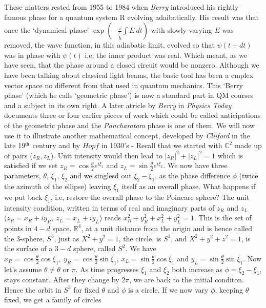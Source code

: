 These matters rested from 1955 to 1984 when \textit{Berry} introduced his rightly
famous phase for a quantum system R evolving adaibatically. His result was that
once the `dynamical phase' $\exp(-  \frac{i}{\not{h}} \int E ~dt)$  with slowly varying $E$ was removed,
the wave function, in this adiabatic limit, evolved so that $\psi(t + dt)$ was in phase
with $\psi(t)$ i.e, the inner product was real. Which meant, as we have seen, that
the phase around a closed circuit would be nonzero. Although we have been
talking about classical light beams, the basic tool has been a cmplex vector
space no different from that used in quantum mechanics. This `Berry phase'
(which he calls `geometric phase') is now a standard part in QM courses and a
subject in its own right. A later atricle by \textit{Berry} in \textit{Physics Today} documents
three or four earlier pieces of work which could be called anticipations of the
geometric phase and the \textit{Pancharatam} phase is one of them. We will now use
it to illustrate another mathematical concept, developed by \textit{Cliiford} in the late
19$^{\rm th}$ century and by $Hopf$ in 1930's - Recall that we started with $\mathbb{C}^2$ made up
of pairs ($z_R, z_L$). Unit intensity would then lead to $| z_R |^2 + | z_L |^2 = 1$ which
is satisfied if we set $z_R = \cos \frac{\theta}{2} e^{i \xi_1}$ and $z_L = \sin \frac{\theta}{2} e^{i \xi_2}$. We now have three
parameters, $\theta$, $\xi_1$, $\xi_2$ and we singlesd out $\xi_2 - \xi_1$, as the phase difference $\phi$ (twice
the azimuth of the ellipse) leaving $\xi_1$ itself as an overall phase. What happens if
we put back $\xi_1$, i.e, restore the overall phase to the Poincare sphere? The unit
intensity condition, written in terms of real and imaginary parts of $z_R$ and $z_L$
$(z_R = x_R + iy_R, ~z_L = x_L + iy_L$) reads $x^2_R + y^2_R + x^2_L + y^2_L = 1$. This is the set of
points in $4-d$ space. $\mathbb{R}^4$, at a unit distance from the origin and is hence called the
3-sphere, $S^3$, just as $X^2 + y^2 = 1$, the circle, is $S^1$, and $X^2 + y^2 + z^2 = 1$, is the
surface of a $3-d$ sphere, called $S^2$. We have $x_R = \cos \frac{\theta}{2} \cos \xi_1, ~y_R = \cos \frac{\theta}{2} \sin \xi_1$, 
$x_L = \sin \frac{\theta}{2} \cos \xi_1$ and $y_L = \sin \frac{\theta}{2} \sin \xi_1$. Now let's assume $\theta \neq \theta$ or $\pi$. As time
progresses $\xi_1$ and $\xi_2$ both increase as $\phi = \xi_2 - \xi_1$, stays constant. After they
change by $2\pi$, we are back to the initial conditon. Hence the orbit in $S^3$ for fixed
$\theta$ and $\phi$ is a circle. If we now vary $\phi$, keeping $\theta$ fixed, we get a family of circles
